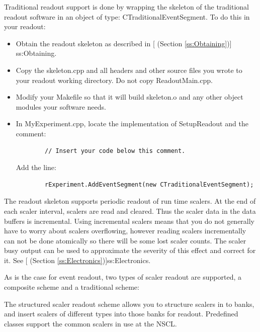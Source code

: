   Traditional readout support is done by wrapping the skeleton of the traditional
   readout software in an object of type: CTraditionalEventSegment. To do this in your readout:
   \begin{itemize}
      \item Obtain the readout skeleton as described in 
      [ (Section \ref{ss:Obtaining})]
      {ss:Obtaining}.
      \item Copy the skeleton.cpp and all headers and other source files you
	 wrote to your readout working directory.  Do not copy ReadoutMain.cpp.
      \item Modify your Makefile so that it will build skeleton.o and any other 
	 object modules your software needs.
      \item In MyExperiment.cpp, locate the implementation of 
	    SetupReadout and the comment:
	    \begin{verbatim}
	    // Insert your code below this comment.
	    \end{verbatim}
	    Add the line:
	    \begin{verbatim}
	    rExperiment.AddEventSegment(new CTraditionalEventSegment);
	    \end{verbatim}
   \end{itemize}
      The readout skeleton supports periodic readout of run time scalers.  
      At the end of each scaler interval, scalers are read and cleared. 
      Thus the scaler data in the data buffers is incremental.  Using
      incremental scalers means that you do not generally have to worry 
      about scalers overflowing, however reading scalers incrementally  can
      not be done atomically so there will be some lost scaler counts.
      The scaler busy output can be used to approximate the severity of this
      effect and correct for it.  See 
      [ 
      (Section \ref{ss:Electronics})]{ss:Electronics}.
      
      As is the case for event readout, two types of scaler readout are
      supported, a composite scheme and a traditional scheme:
      
      The structured scaler readout scheme allows you to structure
      scalers in to banks, and insert scalers of different types into
      those banks for readout.  Predefined classes support the common
      scalers in use at the NSCL.  
      

